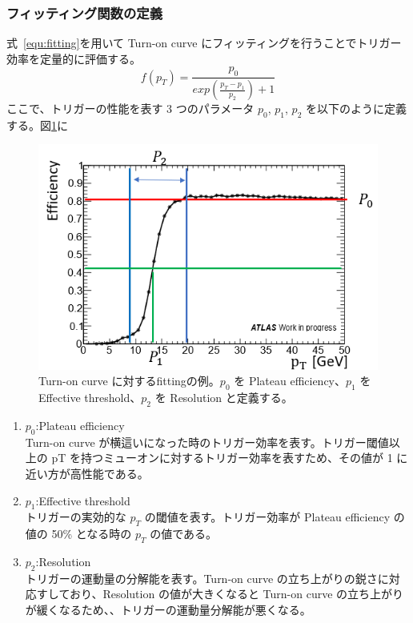\subsubsection{フィッティング関数の定義}\label{section:fitting}
式~\eqref{equ:fitting}を用いて Turn-on curve にフィッティングを行うことでトリガー効率を定量的に評価する。
\begin{equation}
    f(p_T) = \frac{p_0}{exp(\frac{p_T-p_1}{p_2})+1}
　\label{equ:fitting}
\end{equation}
ここで、トリガーの性能を表す 3 つのパラメータ $p_0$, $p_1$, $p_2$ を以下のように定義する。図\ref{fig:fiting}に
\begin{figure}[tb]
  \centering
  \includegraphics[clip, width=12cm]{fig/4/fitting_def.png}
  \caption{Turn-on curve に対するfittingの例。$p_0$ を Plateau efficiency、$p_1$ を Effective threshold、$p_2$ を Resolution と定義する。}
  \label{fig:fiting}
\end{figure}

\begin{enumerate}\label{table:fitting}
   \item $p_0$:Plateau efficiency\\
   Turn-on curve が横這いになった時のトリガー効率を表す。トリガー閾値以上の pT を持つミューオンに対するトリガー効率を表すため、その値が 1 に近い方が高性能である。
   \item $p_1$:Effective threshold\\
   トリガーの実効的な $p_T$ の閾値を表す。トリガー効率が Plateau efficiency の値の 50\% となる時の $p_T$ の値である。
   \item $p_2$:Resolution\\
   トリガーの運動量の分解能を表す。Turn-on curve の立ち上がりの鋭さに対応すしており、Resolution の値が大きくなると Turn-on curve の立ち上がりが緩くなるため、、トリガーの運動量分解能が悪くなる。
\end{enumerate}

